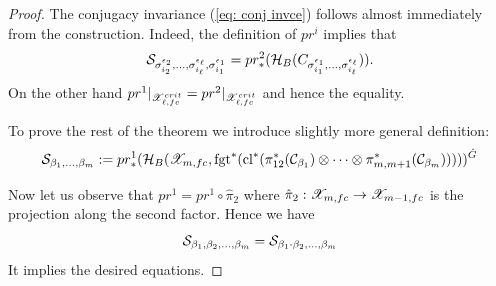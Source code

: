 \begin{proof}
  The conjugacy invariance (\ref{eq: conj invce}) follows almost immediately from the construction. Indeed, the definition of \(pr^i\) implies that
\[  \mathcal{S}_{\sigma_{i_2}^{\epsilon_2},
  \dots,\sigma_{i_\ell}^{\epsilon_\ell},\sigma_{i_1}^{\epsilon_1}}=pr^2_*(\mathcal{H}_{B}(C_{\sigma_{i_1}^{\epsilon_1},\dots,\sigma_{i_\ell}^{\epsilon_\ell}})).\] On the other hand
\(pr^1|_{\mathscr{X}_{\ell,fc}^{crit}}=pr^2|_{\mathscr{X}^{crit}_{\ell,fc}}\) and hence the equality.


  To prove the rest of the theorem we introduce slightly more general definition:
  \[\mathcal{S}_{\beta_1,\dots,\beta_m}:=pr^1_*(\mathcal{H}_B(\mathscr{X}_{m,fc},\mathrm{fgt}^*(\mathrm{cl}^*(\pi_{12}^*(\mathcal{C}_{\beta_1})\otimes
    \dots\otimes  \pi_{m,m+1}^*(\mathcal{C}_{\beta_m})))))^{\hat{G}}\]

  Now let us observe that $pr^1=pr^1\circ \hat{\pi}_2$ where $\hat{\pi}_2:\mathscr{X}_{m,fc}\rightarrow\mathscr{X}_{m-1,fc}$ is the
  projection along the second factor. Hence we have
  \[ \mathcal{S}_{\beta_1,\beta_2,\dots,\beta_m}=\mathcal{S}_{\beta_1\cdot\beta_2,\dots,\beta_m}\]
  It implies the desired equations.

  

\end{proof}

